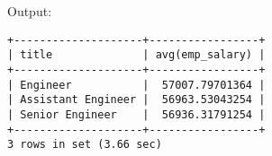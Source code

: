 \documentclass[12pt]{article}
\begin{document}
Output:

\begin{verbatim}
+--------------------+-----------------+
| title              | avg(emp_salary) |
+--------------------+-----------------+
| Engineer           |  57007.79701364 |
| Assistant Engineer |  56963.53043254 |
| Senior Engineer    |  56936.31791254 |
+--------------------+-----------------+
3 rows in set (3.66 sec)
\end{verbatim}

\end{document}
